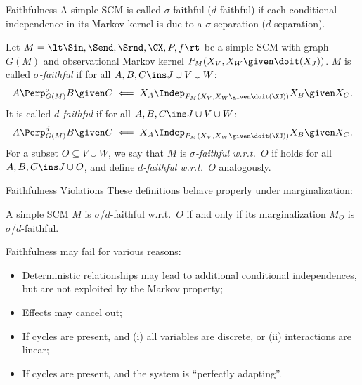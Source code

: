 \begin{frame}{Faithfulness}
A simple SCM is called $\sigma$-faithful ($d$-faithful) if each conditional independence in its Markov kernel
is due to a $\sigma$-separation ($d$-separation).
\begin{Def}
  Let $M = \lt \Sin, \Send, \Srnd, \CX, P, f \rt$ be a simple SCM with graph $G(M)$
  and observational Markov kernel $P_{M}(X_V,X_W \given \doit(X_J))$.
  $M$ is called \emph{$\sigma$-faithful} if 
  for all $A, B, C \ins J \cup V \cup W$:
  \begin{equation}\label{eq:sigma_faithful}
    A \Perp^\sigma_{G(M)} B \given C \impliedby X_A \Indep_{P_{M}(X_V,X_W \given \doit(\XJ))} X_B \given X_C.
  \end{equation}
  It is called \emph{$d$-faithful} if
  for all $A, B, C \ins J \cup V \cup W$:
  \begin{equation*}
    A \Perp^d_{G(M)} B \given C \impliedby X_A \Indep_{P_{M}(X_V,X_W \given \doit(\XJ))} X_B \given X_C.
  \end{equation*}
  For a subset $O \subseteq V \cup W$, we say that $M$ is \emph{$\sigma$-faithful w.r.t.\ $O$} if
   holds for all $A, B, C \ins J \cup O$, and define
  \emph{$d$-faithful w.r.t.\ $O$} analogously.
\end{Def}
\end{frame}

\begin{frame}{Faithfulness Violations}
These definitions behave properly under marginalization:
\begin{Rem}
A simple SCM $M$ is $\sigma$/$d$-faithful w.r.t.\ $O$ if and only if
its marginalization $M_O$ is $\sigma$/$d$-faithful.
\end{Rem}

\bigskip
Faithfulness may fail for various reasons:
\begin{itemize}
  \item Deterministic relationships may lead to additional conditional independences, but are not exploited by the Markov property;
  \item Effects may cancel out;
  \item If cycles are present, and (i) all variables are discrete, or (ii) interactions are linear;
  \item If cycles are present, and the system is ``perfectly adapting''.
\end{itemize}
\end{frame}

